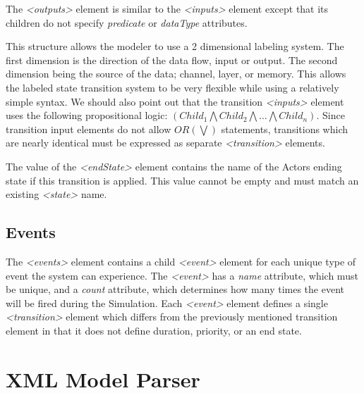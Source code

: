 The {\em \textless outputs\textgreater} element is similar to the {\em \textless inputs\textgreater} element except that its children do not specify {\em predicate} or {\em dataType} attributes.  

This structure allows the modeler to use a 2 dimensional labeling system.  The first dimension is the direction of the data flow, input or output.  The second dimension being the source of the data; channel, layer, or memory.  This allows the labeled state transition system to be very flexible while using a relatively simple syntax.  We should also point out that the transition {\em \textless inputs\textgreater} element uses the following propositional logic: $(Child_{1} \bigwedge Child_{2} \bigwedge \ldots \bigwedge Child_{n})$.  Since transition input elements do not allow $OR (\bigvee)$ statements, transitions which are nearly identical must be expressed as separate {\em \textless transition\textgreater} elements.

The value of the {\em \textless endState\textgreater} element contains the name of the Actors ending state if this transition is applied.  This value cannot be empty and must match an existing {\em \textless state\textgreater} name.

\begin{spacing}{.5}

\end{spacing}


\subsection{Events}

The {\em \textless events\textgreater} element contains a child {\em \textless event\textgreater} element for each unique type of event the system can experience.  The {\em \textless event\textgreater} has a {\em name} attribute, which must be unique, and a {\em count} attribute, which determines how many times the event will be fired during the Simulation.  Each {\em \textless event\textgreater} element defines a single {\em \textless transition\textgreater} element which differs from the previously mentioned transition element in that it does not define duration, priority, or an end state.

\begin{spacing}{.5}

\end{spacing}

\section{XML Model Parser}

